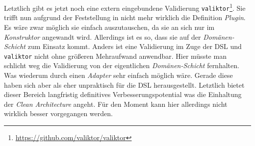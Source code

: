 Letztlich gibt es jetzt noch eine extern eingebundene Validierung \texttt{valiktor}\footnote{\url{https://github.com/valiktor/valiktor}}.
Sie trifft nun aufgrund der Feststellung in  nicht mehr wirklich die Definition \emph{Plugin}.
Es wäre zwar möglich sie einfach auszutauschen, da sie an sich nur im \emph{Konstruktor} angewandt wird.
Allerdings ist es so, dass sie auf der \emph{Domänen-Schicht} zum Einsatz kommt.
Anders ist eine Validierung im Zuge der DSL und \texttt{valiktor} nicht ohne größeren Mehraufwand anwendbar.
Hier müsste man schlicht weg die Validierung von der eigentlichen \emph{Domänen-Schicht} fernhalten. 
Was wiederum durch einen \emph{Adapter} sehr einfach möglich wäre.
Gerade diese haben sich aber als eher unpraktisch für die DSL herausgestellt.
Letztlich bietet dieser Bereich langfristig definitives Verbesserungspotential was die Einhaltung der \emph{Clean Architecture} angeht.
Für den Moment kann hier allerdings nicht wirklich besser vorgegangen werden.
